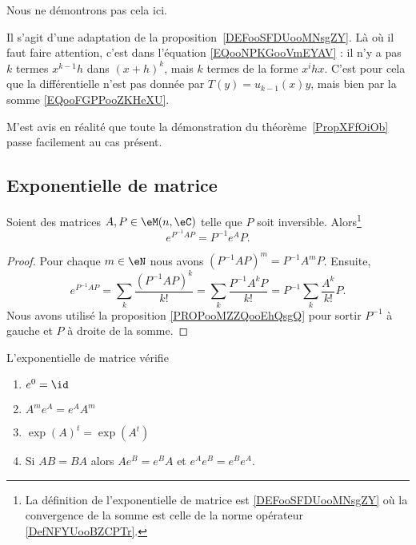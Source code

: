 \begin{normaltext}
	Nous ne démontrons pas cela ici.

	Il s'agit d'une adaptation de la proposition~\ref{DEFooSFDUooMNsgZY}. Là où il faut faire attention, c'est dans l'équation \eqref{EQooNPKGooVmEYAV} : il n'y a pas \( k\) termes \( x^{k-1}h\) dans \( (x+h)^k\), mais \( k\) termes de la forme \( x^ihx\). C'est pour cela que la différentielle n'est pas donnée par \( T(y)=u_{k-1}(x)y\), mais bien par la somme \eqref{EQooFGPPooZKHeXU}.

	M'est avis en réalité que toute la démonstration du théorème~\ref{PropXFfOiOb} passe facilement au cas présent.
\end{normaltext}

\subsection{Exponentielle de matrice}
\label{SECooBYQBooZifJsg}

\begin{proposition}
	Soient des matrices \( A,P\in \eM(n,\eC)\) telle que \( P\) soit inversible. Alors\footnote{La définition de l'exponentielle de matrice est \ref{DEFooSFDUooMNsgZY} où la convergence de la somme est celle de la norme opérateur \ref{DefNFYUooBZCPTr}.}
	\begin{equation}
		e^{P^{-1}AP}=P^{-1} e^{A}P.
	\end{equation}
\end{proposition}

\begin{proof}
	Pour chaque \( m\in \eN\) nous avons \( (P^{-1}AP)^m=P^{-1} A^mP\). Ensuite,
	\begin{equation}
		e^{P^{-1}AP}=\sum_k\frac{(P^{-1}AP)^k}{ k! }=\sum_k\frac{ P^{-1}A^kP }{ k! }=P^{-1}\sum_k\frac{ A^k }{ k! }P.
	\end{equation}
	Nous avons utilisé la proposition \ref{PROPooMZZQooEhQsgQ} pour sortir \( P^{-1}\) à gauche et \( P\) à droite de la somme.
\end{proof}

\begin{proposition}       \label{PROPooFLHPooRhLiZE}
	L'exponentielle de matrice vérifie
	\begin{enumerate}
		\item       \label{ITEMooCVALooEfLQCyI}
		      \( e^0=\id\)
		\item       \label{ITEMooNGPWooIyPEQt}
		      \( A^m e^{A}= e^{A}A^m\)
		\item       \label{ITEMooEOSMooQWjcjA}
		      \( \exp(A)^t=\exp(A^t)\)
		\item       \label{ITEMooROPJooMarenu}
		      Si \( AB=BA\) alors \( A e^{B}= e^{B}A\) et \(  e^{A} e^{B}= e^{B} e^{A}\).
	\end{enumerate}
\end{proposition}

